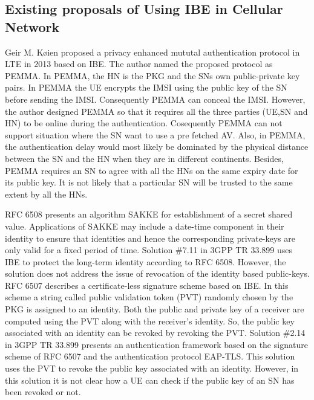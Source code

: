 \documentclass{river-journal}
\begin{document}
\subsection{Existing proposals of Using IBE in Cellular Network}
Geir M. K{\o}ien proposed a privacy enhanced mututal authentication protocol in LTE in 2013 \cite{koienibe} based on IBE. The author named the proposed protocol as PEMMA. In PEMMA, the HN is the PKG and the SNs own public-private key pairs. In PEMMA the UE encrypts the IMSI using the public key of the SN before sending the IMSI. Consequently PEMMA can conceal the IMSI. However, the author designed PEMMA so that it requires all the three parties (UE,SN and HN) to be online during the authentication. Cosequently PEMMA can not support situation where the SN want to use a pre fetched AV. Also, in PEMMA, the authentication delay would most likely be dominated by the physical distance between the SN and the HN when they are in different continents. Besides, PEMMA requires an SN to agree with all the HNs on the same expiry date for its public key. It is not likely that a particular SN will be trusted to the same extent by all the HNs. 

RFC 6508 \cite{RFC6508} presents an algorithm SAKKE for establishment of a secret shared value. Applications of SAKKE may include a date-time component in their identity to ensure that identities and hence the corresponding private-keys are only valid for a fixed period of time. Solution \#7.11 in 3GPP TR 33.899 \cite{TR33899} uses IBE to protect the long-term identity according to RFC 6508. However, the solution does not address the issue of revocation of the identity based public-keys. RFC 6507 \cite{RFC6507} describes a certificate-less signature scheme based on IBE. In this scheme a string called public validation token (PVT) randomly chosen by the PKG is assigned to an identity. Both the public and private key of a receiver are computed using the PVT along with the receiver's identity. So, the public key associated with an identity can be revoked by revoking the PVT. Solution \#2.14 in 3GPP TR 33.899 presents an authentication framework based on the signature scheme of RFC 6507 and the authentication protocol EAP-TLS. This solution uses the PVT to revoke the public key associated with an identity. However, in this solution it is not clear how a UE can check if the public key of an SN has been revoked or not.
\end{document}
